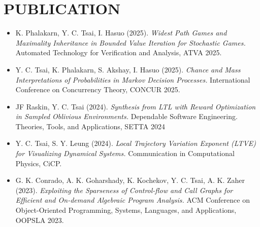 \documentclass[10pt,a4paper,roman]{moderncv}        %
\makeatletter
\newcommand*{\customcventry}[5][.25em]{
  \begin{tabular}{@{}l} 
    {\bfseries #2}
  \end{tabular}
  \hfill%
  \begin{tabular}{l@{}}
     {\bfseries #3}
  \end{tabular} 
  \ifx&#5&%
  \else{\\%
    \begin{minipage}{\maincolumnwidth}%
      \small#5%
    \end{minipage}}\fi%
  }
\makeatother
\begin{document}
\section{PUBLICATION}
\begin{itemize}
  \item K. Phalakarn, Y. C. Tsai, I. Hasuo (2025). \textit{Widest Path Games and Maximality Inheritance in Bounded Value Iteration for Stochastic Games.} Automated Technology for Verification and Analysis, ATVA 2025.
  \item Y. C. Tsai, K. Phalakarn, S. Akshay, I. Hasuo (2025). \textit{Chance and Mass Interpretations of Probabilities in Markov Decision Processes.} International Conference on Concurrency Theory, CONCUR 2025.
  \item JF Raskin, Y. C. Tsai (2024). \textit{Synthesis from LTL with Reward Optimization in Sampled Oblivious Environments.} Dependable Software Engineering. Theories, Tools, and Applications, SETTA 2024
  \item Y. C. Tsai, S. Y. Leung (2024). \textit{Local Trajectory Variation Exponent (LTVE) for Visualizing Dynamical Systems.} Communication in Computational Physics, CiCP.
  \item G. K. Conrado, A. K. Goharshady, K. Kochekov, Y. C. Tsai, A. K. Zaher (2023).  \textit{Exploiting the Sparseness of Control-flow and Call Graphs for Efficient and On-demand Algebraic Program Analysis.} ACM Conference on Object-Oriented Programming, Systems, Languages, and Applications, OOPSLA 2023.
\end{itemize}


\end{document}
